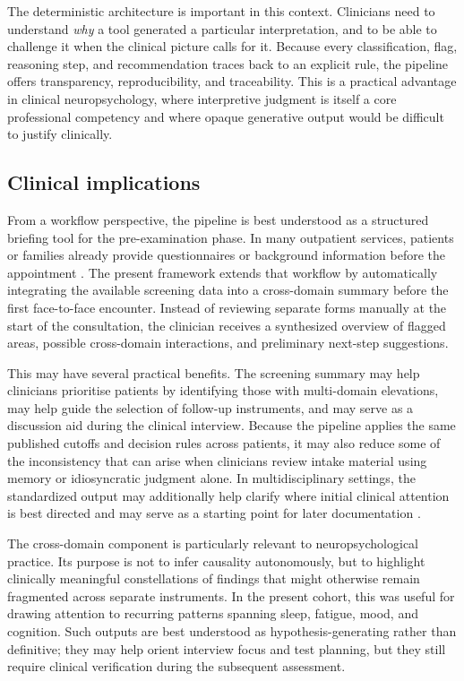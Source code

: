 \documentclass[11pt,a4paper]{article}
\begin{document}
The deterministic architecture is important in this context. Clinicians need to understand \textit{why} a tool generated a particular interpretation, and to be able to challenge it when the clinical picture calls for it. Because every classification, flag, reasoning step, and recommendation traces back to an explicit rule, the pipeline offers transparency, reproducibility, and traceability. 
This is a practical advantage in clinical neuropsychology, where interpretive judgment is itself a core professional competency and where opaque generative output would be difficult to justify clinically. %

\subsection{Clinical implications}

From a workflow perspective, the pipeline is best understood as a structured briefing tool for the pre-examination phase. In many outpatient services, patients or families already provide questionnaires or background information before the appointment \citep[e.g.,][]{KingsCollegeNeuropsychology2026, StanfordNeuropsychologyForms2026}. The present framework extends that workflow by automatically integrating the available screening data into a cross-domain summary before the first face-to-face encounter. Instead of reviewing separate forms manually at the start of the consultation, the clinician receives a synthesized overview of flagged areas, possible cross-domain interactions, and preliminary next-step suggestions.

This may have several practical benefits. The screening summary may help clinicians prioritise patients by identifying those with multi-domain elevations, may help guide the selection of follow-up instruments, and may serve as a discussion aid during the clinical interview. Because the pipeline applies the same published cutoffs and decision rules across patients, it may also reduce some of the inconsistency that can arise when clinicians review intake material using memory or idiosyncratic judgment alone. In multidisciplinary settings, the standardized output may additionally help clarify where initial clinical attention is best directed and may serve as a starting point for later documentation \citep{Postal2018ReportWriting}.

The cross-domain component is particularly relevant to neuropsychological practice. Its purpose is not to infer causality autonomously, but to highlight clinically meaningful constellations of findings that might otherwise remain fragmented across separate instruments. In the present cohort, this was useful for drawing attention to recurring patterns spanning sleep, fatigue, mood, and cognition. Such outputs are best understood as hypothesis-generating rather than definitive; they may help orient interview focus and test planning, but they still require clinical verification during the subsequent assessment.
\end{document}
